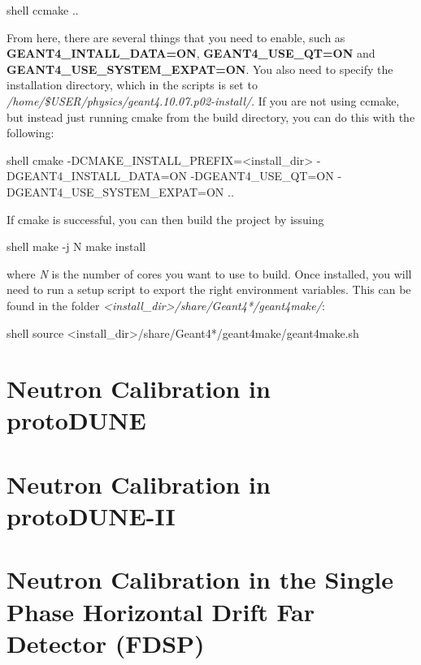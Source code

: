 \documentclass[8pt]{refart}
\begin{document}
\begin{code}{shell}
  ccmake ..
\end{code}
From here, there are several things that you need to enable, such as \textbf{GEANT4\_INTALL\_DATA=ON}, \textbf{GEANT4\_USE\_QT=ON} and\\
\textbf{GEANT4\_USE\_SYSTEM\_EXPAT=ON}.  You also need to specify the installation directory, which in the scripts is set to\\ \textit{/home/\$USER/physics/geant4.10.07.p02-install/}.  If you are not using ccmake, but instead just running cmake from the build directory, you can do this with the following:
\begin{code}{shell}
  cmake -DCMAKE_INSTALL_PREFIX=<install_dir> -DGEANT4_INSTALL_DATA=ON -DGEANT4_USE_QT=ON -DGEANT4_USE_SYSTEM_EXPAT=ON ..
\end{code}
If cmake is successful, you can then build the project by issuing
\begin{code}{shell}
  make -j N
  make install
\end{code}
where \textit{N} is the number of cores you want to use to build.  Once installed, you will need to run a setup script to export the right environment variables.  This can be found in the folder \textit{<install\_dir>/share/Geant4*/geant4make/}:
\begin{code}{shell}
  source <install_dir>/share/Geant4*/geant4make/geant4make.sh
\end{code}
  


\section{Neutron Calibration in protoDUNE}

\section{Neutron Calibration in protoDUNE-II}

\section{Neutron Calibration in the Single Phase Horizontal Drift Far Detector (FDSP)}
\end{document}
